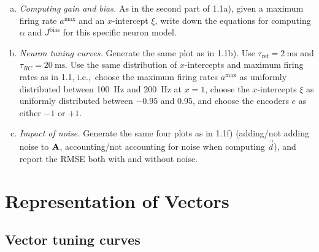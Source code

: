 	\begin{enumerate}[a)]
		\item {} \textit{Computing gain and bias.} As in the second part of 1.1a), given a maximum firing rate $a^\mathrm{max}$ and an $x$-intercept $\xi$, write down the equations for computing $\alpha$ and $J^\mathrm{bias}$ for this specific neuron model.
		\item {} \textit{Neuron tuning curves.} Generate the same plot as in 1.1b). Use $\tau_\mathrm{ref}=\SI{2}{\milli\second}$ and $\tau_{RC}=\SI{20}{\milli\second}$. Use the same distribution of $x$-intercepts and maximum firing rates as in 1.1, i.e.,~choose the maximum firing rates $a^\mathrm{max}$ as uniformly distributed between \SI{100}{\hertz} and \SI{200}{\hertz} at $x=1$, choose the $x$-intercepts $\xi$ as uniformly distributed between $-0.95$ and $0.95$, and choose the encoders $e$ as either $-1$ or $+1$.
		\item {} \textit{Impact of noise.} Generate the same four plots as in 1.1f) (adding/not adding noise to ${\mathbf{A}}$, accounting/not accounting for noise when computing $\vec d$), and report the RMSE both with and without noise.
	\end{enumerate}
	
	\section{Representation of Vectors}

	\subsection{Vector tuning curves}

